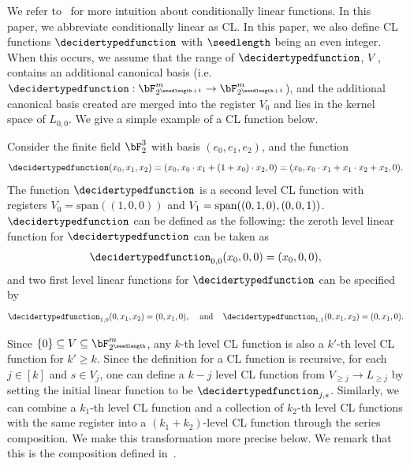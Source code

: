 We refer to~ for more intuition about conditionally linear functions. In this paper, we abbreviate conditionally linear as CL. In this paper, we also define CL functions $\decidertypedfunction$ with $\seedlength$ being an even integer. When this occurs, we assume that the range of $\decidertypedfunction$, $V$ , contains an additional canonical basis (i.e. $\decidertypedfunction: \bF_{2^{\seedlength+1}}^m \rightarrow \bF_{2^{\seedlength+1}}^m$), and the additional canonical basis created are merged into the register $V_0$ and lies in the kernel space of $L_{0,0}$. We give a simple example of a CL function below. 
\begin{example}
	Consider the finite field $\bF_{2}^3$ with basis $(e_0, e_1, e_2)$, and the function 
	\begin{equation*}
		\decidertypedfunction(x_0, x_1, x_2) = (x_0, x_0 \cdot x_1 + (1+x_0)\cdot x_2, 0) = (x_0, x_0 \cdot x_1 + x_1 \cdot x_2 + x_2, 0 ).
	\end{equation*}
	The function $\decidertypedfunction$ is a second level CL function with registers $V_0 = \text{span}((1,0,0))$ and $V_1 = \text{span}((0,1,0), \\ (0,0,1))$. $\decidertypedfunction$ can be defined as the following: the zeroth level linear function for $\decidertypedfunction$ can be taken as
	\begin{equation*}
		\decidertypedfunction_{0,0}(x_0,0,0) = (x_0,0,0),
	\end{equation*}
	and two first level linear functions for $\decidertypedfunction$ can be specified by
	\begin{equation*}
		\decidertypedfunction_{1,0}(0,x_1,x_2) = (0,x_1,0), \, \quad  \text{and} \quad \, 	\decidertypedfunction_{1,1}(0,x_1,x_2) = (0,x_1,0).
	\end{equation*}
\end{example}
 Since $\{0\} \subseteq V \subseteq \bF_{2^\seedlength}^m$, any $k$-th level CL function is also a $k'$-th level CL function for $k' \geq k$. Since the definition for a CL function is recursive, for each $j \in [k]$ and $s \in V_j$, one can define a $k -j$ level CL function from $V_{\geq j} \rightarrow L_{\geq j}$ by setting the initial linear function to be $\decidertypedfunction_{j, s}$. Similarly, we can combine a $k_1$-th level CL function and a collection of $k_2$-th level CL functions with the same register into a $(k_1 + k_2)$-level CL function through the series composition. We make this transformation more precise below. We remark that this is the composition defined in~\cite[Lemma 4.7]{jiMIPRE2022a}.

